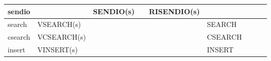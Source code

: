 \begin{table}[H]
\begin{longtable}{|l||l|l|l|l|l|l|l|l|}
sendio    &            & SENDIO(s) &            & RISENDIO(s) &         &          &          &           \\ \hline
search    & VSEARCH(s) &           &            &             & SEARCH  &          &          &           \\ \hline
csearch   & VCSEARCH(s)&           &            &             & CSEARCH &          &          &           \\ \hline
insert    & VINSERT(s) &           &            &             & INSERT  &          &          &           \\ \hline
\end{longtable}
\end{table}



